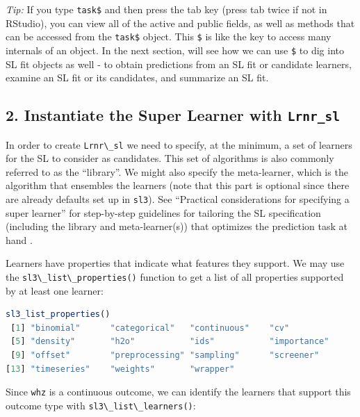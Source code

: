 \documentclass[
  12pt, krantz2,
]{krantz}
\newcommand{\passthrough}[1]{#1}
\newcommand{\1}{\mathbbm{1}}
\theoremstyle{definition}
\theoremstyle{definition}
\theoremstyle{definition}
\theoremstyle{definition}
\theoremstyle{remark}
\begin{document}
\emph{Tip:} If you type \passthrough{\lstinline!task$!} and then press the tab key (press tab twice if not in
RStudio), you can view all of the active and public fields, as well as methods that
can be accessed from the \passthrough{\lstinline!task$!} object. This \passthrough{\lstinline!$!} is like the key to access
many internals of an object. In the next section, will see how we can use \passthrough{\lstinline!$!}
to dig into SL fit objects as well - to obtain predictions from an SL fit or
candidate learners, examine an SL fit or its candidates, and summarize an SL
fit.

\hypertarget{instantiate-the-super-learner-with-lrnr_sl}{%
\subsection*{\texorpdfstring{2. Instantiate the Super Learner with \texttt{Lrnr\_sl}}{2. Instantiate the Super Learner with Lrnr\_sl}}\label{instantiate-the-super-learner-with-lrnr_sl}}


In order to create \passthrough{\lstinline!Lrnr\_sl!} we need to specify, at the minimum, a set of
learners for the SL to consider as candidates. This set of algorithms is
also commonly referred to as the ``library''. We might also specify the
meta-learner, which is the algorithm that ensembles the learners (note that this part is
optional since there are already defaults set up in \passthrough{\lstinline!sl3!}). See ``Practical
considerations for specifying a super learner'' for step-by-step guidelines for
tailoring the SL specification (including the library and meta-learner(s)) that optimizes the prediction task at hand \citep{rvp2022super}.

Learners have properties that indicate what features they support. We may use
the \passthrough{\lstinline!sl3\_list\_properties()!} function to get a list of all properties supported
by at least one learner:

\begin{lstlisting}[language=R]
sl3_list_properties()
 [1] "binomial"      "categorical"   "continuous"    "cv"           
 [5] "density"       "h2o"           "ids"           "importance"   
 [9] "offset"        "preprocessing" "sampling"      "screener"     
[13] "timeseries"    "weights"       "wrapper"      
\end{lstlisting}

Since \passthrough{\lstinline!whz!} is a continuous outcome, we can identify the learners that support
this outcome type with \passthrough{\lstinline!sl3\_list\_learners()!}:
\end{document}
